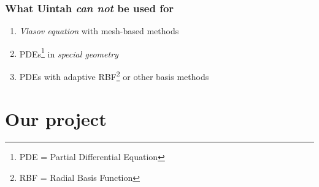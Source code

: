 \documentclass{beamer}
\begin{document}
\begin{frame}
 \frametitle{What Uintah \emph{can not} be used for}
 \begin{enumerate}
  \item \emph{Vlasov equation} with mesh-based methods
  \item PDEs\footnote{PDE = Partial Differential Equation} in \emph{special geometry}
  \item PDEs with adaptive RBF\footnote{RBF = Radial Basis Function} or other basis methods
 \end{enumerate}
\end{frame}



\section{Our project}
\end{document}
